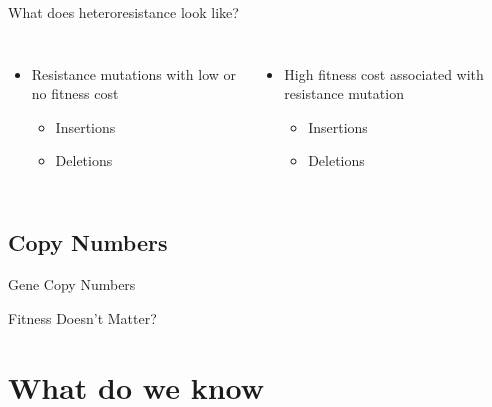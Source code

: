 \documentclass[aspectratio=169,  notheorems, sOuRcEs]{RUCPresentation}
\begin{document}
\begin{frame}

    What does heteroresistance look like?
    \begin{columns}[T]
        \column{0.5\framewidth}

        \begin{itemize}
            \item Resistance mutations with low or no fitness cost
                \begin{itemize}
                    \item Insertions
                    \item Deletions
                \end{itemize}
        \end{itemize}

        \column{0.5\framewidth}

        \begin{itemize}
            \item High fitness cost associated with resistance mutation
                \begin{itemize}
                    \item Insertions
                    \item Deletions
                \end{itemize}
        \end{itemize}

    \end{columns}

\end{frame}

\subsection{Copy Numbers}

\begin{frame}{Gene Copy Numbers}
\end{frame}


\begin{frame}{Fitness Doesn't Matter?}



\end{frame}



\section{What do we know}
\end{document}
